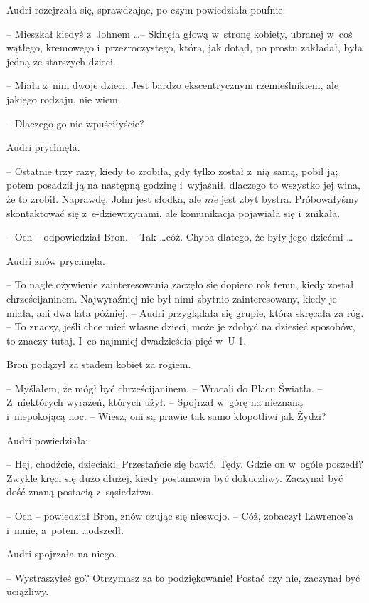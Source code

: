 \documentclass[oneside,polish,11pt,rmheadings]{mwbk}
\begin{document}
Audri rozejrzała się, sprawdzając, po czym powiedziała poufnie: 

-- Mieszkał kiedyś z~Johnem \ldots  -- Skinęła głową w~stronę kobiety, ubranej w~coś wątłego, kremowego i~przezroczystego, która, jak dotąd, po prostu zakładał, była jedną ze starszych dzieci. 

-- Miała z~nim dwoje dzieci. Jest bardzo ekscentrycznym rzemieślnikiem, ale jakiego rodzaju, nie wiem. 

-- Dlaczego go nie wpuściłyście? 

Audri prychnęła. 

-- Ostatnie trzy razy, kiedy to zrobiła, gdy tylko został z~nią samą, pobił ją; potem posadził ją na następną godzinę i~wyjaśnił, dlaczego to wszystko jej wina, że to zrobił. Naprawdę, John jest słodka, ale \textit{nie }jest zbyt bystra. Próbowałyśmy skontaktować się z~e-dziewczynami, ale komunikacja pojawiała się i~znikała. 

-- Och -- odpowiedział Bron. -- Tak \ldots  cóż. Chyba dlatego, że były jego dziećmi \ldots  

Audri znów prychnęła. 

-- To nagłe ożywienie zainteresowania zaczęło się dopiero rok temu, kiedy został chrześcijaninem. Najwyraźniej nie był nimi zbytnio zainteresowany, kiedy je miała, ani dwa lata później. -- Audri przyglądała się grupie, która skręcała za róg. -- To znaczy, jeśli chce mieć własne dzieci, może je zdobyć na dziesięć sposobów, to znaczy tutaj. I~co najmniej dwadzieścia pięć w~U-1. 

Bron podążył za stadem kobiet za rogiem. 

-- Myślałem, że mógł być chrześcijaninem. -- Wracali do Placu Światła. -- Z~niektórych wyrażeń, których użył. -- Spojrzał w~górę na nieznaną i~niepokojącą noc. -- Wiesz, oni są prawie tak samo kłopotliwi jak Żydzi? 

Audri powiedziała:  

-- Hej, chodźcie, dzieciaki. Przestańcie się bawić. Tędy. Gdzie on w~ogóle poszedł? Zwykle kręci się dużo dłużej, kiedy postanawia być dokuczliwy. Zaczynał być dość znaną postacią z~sąsiedztwa. 

-- Och -- powiedział Bron, znów czując się nieswojo. -- Cóż, zobaczył Lawrence'a i~mnie, a~potem \ldots  odszedł. 

Audri spojrzała na niego. 

-- Wystraszyłeś go? Otrzymasz za to podziękowanie! Postać czy nie, zaczynał być uciążliwy. 
\end{document}
